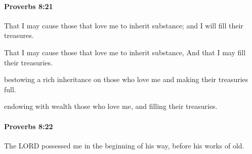 		\paragraph{Proverbs 8:21} %
			\label{PROVERBS-8-21}

			That I may cause those that love me to inherit substance; and I will fill their treasures.

			\begin{versebox}
					\item[BHS] 
					\item[ASV] That I may cause those that love me to inherit substance, And that I may fill their treasuries.
					\item[NIV] bestowing a rich inheritance on those who love me and making their treasuries full.
					\item[NRSV] endowing with wealth those who love me, and filling their treasuries.
			\end{versebox}

		\paragraph{Proverbs 8:22} %
			\label{PROVERBS-8-22}

			The LORD possessed me in the beginning of his way, before his works of old.

